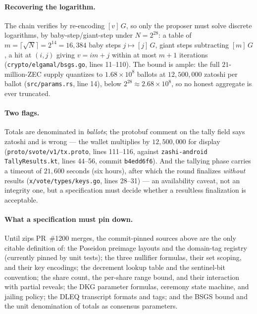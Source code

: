 \documentclass[11pt,a4paper]{article}
\theoremstyle{definition}
\begin{document}
\paragraph{Recovering the logarithm.} The chain verifies by re-encoding
$[v]\,G$, so only the proposer must solve discrete logarithms, by
baby-step/giant-step under $N = 2^{28}$: a table of $m = \lceil \sqrt{N}
\rceil = 2^{14} = 16{,}384$ baby steps $j \mapsto [j]\,G$, giant steps
subtracting $[m]\,G$, a hit at $(i, j)$ giving $v = i m + j$ within at most
$m + 1$ iterations (\texttt{crypto/elgamal/bsgs.go}, lines 11--110). The
bound is ample: the full $21$-million-ZEC supply quantizes to
$1.68 \times 10^{8}$ ballots at $12{,}500{,}000$ zatoshi per ballot
(\texttt{src/params.rs}, line 14), below $2^{28} \approx 2.68 \times
10^{8}$, so no honest aggregate is ever truncated.

\paragraph{Two flags.}
\begin{sloppypar}
Totals are denominated in \emph{ballots}; the
protobuf comment on the tally field says zatoshi and is wrong --- the wallet
multiplies by $12{,}500{,}000$ for display
(\texttt{proto/svote/v1/tx.proto}, lines 111--116, against
\texttt{zashi-android} \texttt{TallyResults.kt}, lines 44--56, commit
\texttt{b4edd6f6}). And the tallying phase carries a timeout of $21{,}600$
seconds (six hours), after which the round finalizes \emph{without}
results (\texttt{x/vote/types/keys.go}, lines 28--31) --- an availability
caveat, not an integrity one, but a specification must decide whether a
resultless finalization is acceptable.
\end{sloppypar}

\paragraph{What a specification must pin down.} Until zips PR~\#1200
merges, the commit-pinned sources above are the only citable definition of:
the Poseidon preimage layouts and the domain-tag registry (currently pinned
by unit tests); the three nullifier formulas, their set scoping, and their
key encodings; the decrement lookup table and the sentinel-bit convention;
the share count, the per-share range bound, and their interaction with
partial reveals; the DKG parameter formulas, ceremony state machine, and
jailing policy; the DLEQ transcript formats and tags; and the BSGS bound and
the unit denomination of totals as consensus parameters.
\end{document}
